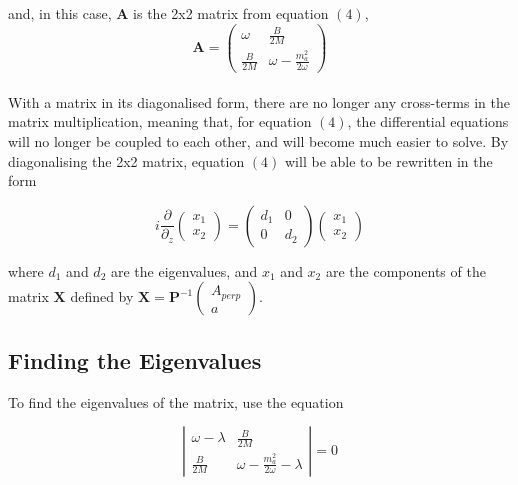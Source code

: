 \documentclass[12pt]{article}
\begin{document}
and, in this case, $\textbf{A}$ is the 2x2 matrix from equation $(4)$, 
\\
\begin{equation*}
\textbf{A} = \left( \begin{array}{ccc} \omega & \frac{B}{2M} \\ \frac{B}{2M} & 
\omega-\frac{m_a^2}{2\omega} \end{array} \right)
\end{equation*}
\\
With a matrix in its diagonalised form, there are no longer any cross-terms in the matrix multiplication, meaning that, for equation $(4)$, the differential equations will no longer be coupled to each other, and will become much easier to solve. By diagonalising the 2x2 matrix, equation $(4)$ will be able to be rewritten in the form

\begin{equation}
i\frac{\partial}{\partial_z} \left( \begin{array}{ccc} x_1 \\ x_2 \end{array} \right) = \left( \begin{array}{ccc} d_1 & 0 \\ 0 & d_2 \end{array} \right) \left( \begin{array}{ccc} x_1 \\ x_2 \end{array} \right)
\end{equation}

where $d_1$ and $d_2$ are the eigenvalues, and $x_1$ and $x_2$ are the components of the matrix $\textbf{X}$ defined by $\textbf{X} = \textbf{P}^{-1} \left( \begin{array}{ccc} A_{perp} \\ a \end{array} \right)$.

\subsection{Finding the Eigenvalues}

To find the eigenvalues of the matrix, use the equation 

\begin{equation}
\left| \begin{array}{ccc}
\omega - \lambda & \frac{B}{2M} \\
\frac{B}{2M} & \omega - \frac{m_a^2}{2\omega} - \lambda \end{array} \right| = 0
\end{equation}
\end{document}
